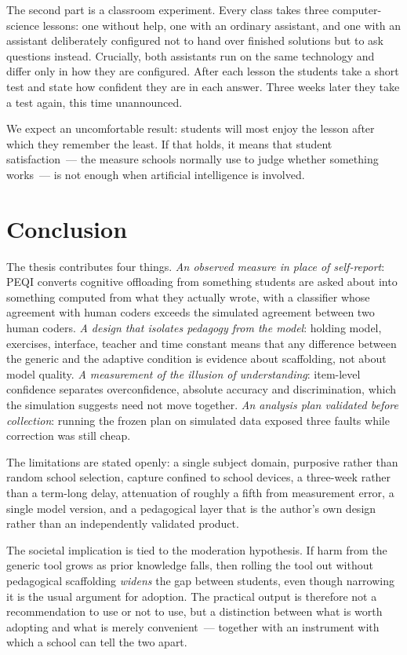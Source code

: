 The second part is a classroom experiment. Every class takes three computer-science lessons: one without help, one with an ordinary assistant, and one with an assistant deliberately configured not to hand over finished solutions but to ask questions instead. Crucially, both assistants run on the same technology and differ only in how they are configured. After each lesson the students take a short test and state how confident they are in each answer. Three weeks later they take a test again, this time unannounced.

We expect an uncomfortable result: students will most enjoy the lesson after which they remember the least. If that holds, it means that student satisfaction~--- the measure schools normally use to judge whether something works~--- is not enough when artificial intelligence is involved.

\section*{Conclusion}

The thesis contributes four things. \emph{An observed measure in place of self-report}: PEQI converts cognitive offloading from something students are asked about into something computed from what they actually wrote, with a classifier whose agreement with human coders exceeds the simulated agreement between two human coders. \emph{A design that isolates pedagogy from the model}: holding model, exercises, interface, teacher and time constant means that any difference between the generic and the adaptive condition is evidence about scaffolding, not about model quality. \emph{A measurement of the illusion of understanding}: item-level confidence separates overconfidence, absolute accuracy and discrimination, which the simulation suggests need not move together. \emph{An analysis plan validated before collection}: running the frozen plan on simulated data exposed three faults while correction was still cheap.

The limitations are stated openly: a single subject domain, purposive rather than random school selection, capture confined to school devices, a three-week rather than a term-long delay, attenuation of roughly a fifth from measurement error, a single model version, and a pedagogical layer that is the author's own design rather than an independently validated product.

The societal implication is tied to the moderation hypothesis. If harm from the generic tool grows as prior knowledge falls, then rolling the tool out without pedagogical scaffolding \emph{widens} the gap between students, even though narrowing it is the usual argument for adoption. The practical output is therefore not a recommendation to use or not to use, but a distinction between what is worth adopting and what is merely convenient~--- together with an instrument with which a school can tell the two apart.

